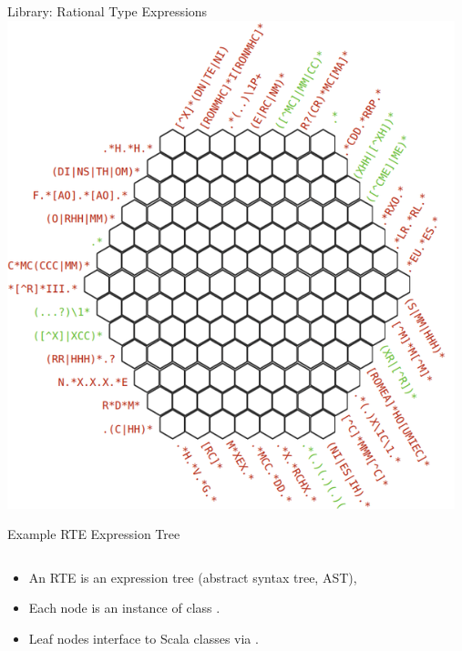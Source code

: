 \newsavebox\rteast
\begin{lrbox}{\rteast}
  \begin{minipage}{11cm}
    
  \end{minipage}
\end{lrbox}


{  

\begin{frame}{Library: }{Rational Type Expressions}
 \centering
  \includegraphics[height=0.8\textheight]{relib.png}
\end{frame}
}

\begin{frame}{Example RTE Expression Tree}
  \begin{columns}[T]
    \begin{column}{0.55\textwidth}
      \usebox\rteast
    \end{column}%
    \begin{column}{0.45\textwidth}
      \scalebox{0.7}{}
    \end{column}
  \end{columns} 

  \medskip

  \begin{itemize}
  \item An RTE is an expression tree (abstract syntax
    tree, AST),
  \item Each node is an instance of class .
  \item Leaf nodes interface to Scala classes via .
  \end{itemize}
\end{frame}

